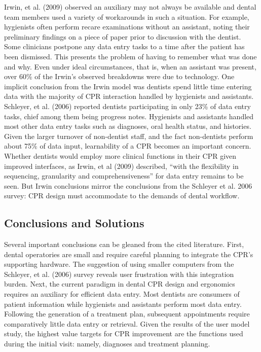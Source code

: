 \documentclass[11pt]{article}
\begin{document}
Irwin, et al. (2009) observed an auxiliary may not always be available and dental team members used a variety of workarounds in such a situation. For example, hygienists often perform recare examinations without an assistant, noting their preliminary findings on a piece of paper prior to discussion with the dentist. Some clinicians postpone any data entry tasks to a time after the patient has been dismissed. This presents the problem of having to remember what was done and why. Even under ideal circumstances, that is, when an assistant was present, over 60\% of the Irwin's observed breakdowns were due to technology. One implicit conclusion from the Irwin model was dentists spend little time entering data with the majority of CPR interaction handled by hygienists and assistants. Schleyer, et al. (2006) reported dentists participating in only 23\% of data entry tasks, chief among them being progress notes. Hygienists and assistants handled most other data entry tasks such as diagnoses, oral health status, and histories. Given the larger turnover of non-dentist staff, and the fact non-dentists perform about 75\% of data input, learnability of a CPR becomes an important concern. Whether dentists would employ more clinical functions in their CPR given improved interfaces, as Irwin, et al (2009) described, ``with the flexibility in sequencing, granularity and comprehensiveness'' for data entry remains to be seen. But Irwin conclusions mirror the conclusions from the Schleyer et al. 2006 survey: CPR design must accommodate to the demands of dental workflow.

\subsection{Conclusions and Solutions}
Several important conclusions can be gleaned from the cited literature. First, dental operatories are small and require careful planning to integrate the CPR's supporting hardware. The suggestion of using smaller computers from the Schleyer, et al. (2006) survey reveals user frustration with this integration burden. Next, the current paradigm in dental CPR design and ergonomics requires an auxiliary for efficient data entry. Most dentists are consumers of patient information while hygienists and assistants perform most data entry. Following the generation of a treatment plan, subsequent appointments require comparatively little data entry or retrieval. Given the results of the user model study, the highest value targets for CPR improvement are the functions used during the initial visit: namely, diagnoses and treatment planning.
\end{document}
